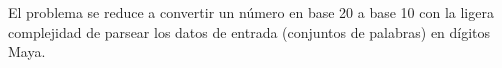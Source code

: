 
El problema se reduce a convertir un n\'umero en base 20 a base 10 con la ligera complejidad de parsear los datos de entrada (conjuntos de palabras) en d\'igitos Maya.

